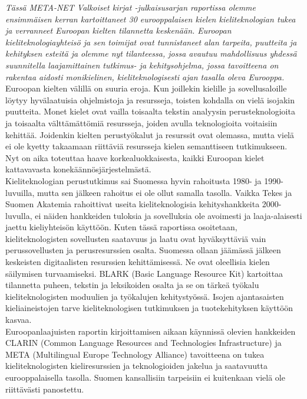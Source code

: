 \begin{multicols}{2}
\emph{Tässä META-NET Valkoiset kirjat -julkaisusarjan raportissa
olemme ensimmäisen kerran kartoittaneet 30 eurooppalaisen kielen
kieliteknologian tukea ja verranneet Euroopan kielten tilannetta
keskenään. Euroopan kieliteknologiayhteisö ja sen toimijat ovat
tunnistaneet alan tarpeita, puutteita ja kehityksen esteitä ja olemme
nyt tilanteessa, jossa avautuu mahdollisuus yhdessä suunnitella
laajamittainen tutkimus- ja kehitysohjelma, jossa tavoitteena on rakentaa
aidosti monikielinen, kieliteknologisesti ajan tasalla oleva
Eurooppa.}\\
Euroopan kielten välillä on suuria eroja. Kun joillekin kielille ja
sovellusaloille löytyy hyvälaatuisia ohjelmistoja ja resursseja,
toisten kohdalla on vielä isojakin puutteita. Monet kielet
ovat vailla toisaalta tekstin analyysin perusteknologioita ja
toisaalta välttämättömiä resursseja, joiden avulla teknologioita
voitaisiin kehittää. Joidenkin kielten perustyökalut ja resurssit ovat
olemassa, mutta vielä ei ole kyetty takaamaan riittäviä resursseja
kielen semanttiseen tutkimukseen. Nyt on aika toteuttaa haave 
korkealuokkaisesta, kaikki Euroopan kielet kattavavasta konekäännösjärjestelmästä.\\
Kieliteknologian perustutkimus sai Suomessa hyvin rahoitusta 1980-
ja 1990-luvuilla, mutta sen jälkeen rahoitus ei ole ollut samalla
tasolla. Vaikka Tekes ja Suomen Akatemia rahoittivat useita
kieliteknologisia kehityshankkeita 2000-luvulla, ei näiden hankkeiden
tuloksia ja sovelluksia ole avoimesti ja laaja-alaisesti jaettu
kieliyhteisön käyttöön. Kuten tässä raportissa osoitetaan,
kieliteknologisten sovellusten saatavuus ja laatu ovat hyväksyttäviä
vain perussovellusten ja perusresurssien osalta. Suomessa ollaan
jäämässä jälkeen keskeisten digitaalisten resurssien
kehittämisessä. Ne ovat oleellisia kielen säilymisen
turvaamiseksi. BLARK (Basic Language Resource Kit) kartoittaa
tilannetta puheen, tekstin ja leksikoiden osalta ja se on tärkeä
työkalu kieliteknologisten moduulien ja työkalujen
kehitystyössä. Isojen ajantasaisten kieliaineistojen tarve
kieliteknologisen tutkimuksen ja tuotekehityksen käyttöön kasvaa.\\
Euroopanlaajuisten raportin kirjoittamisen aikaan käynnissä 
olevien hankkeiden CLARIN (Common Language Resources and Technologies Infrastructure) ja META
(Multilingual Europe Technology Alliance) tavoitteena on tukea
kieliteknologisten kieliresurssien ja teknologioiden jakelua ja
saatavuutta eurooppalaisella tasolla. Suomen kansallisiin tarpeisiin
ei kuitenkaan vielä ole riittävästi panostettu.\\

\end{multicols}
